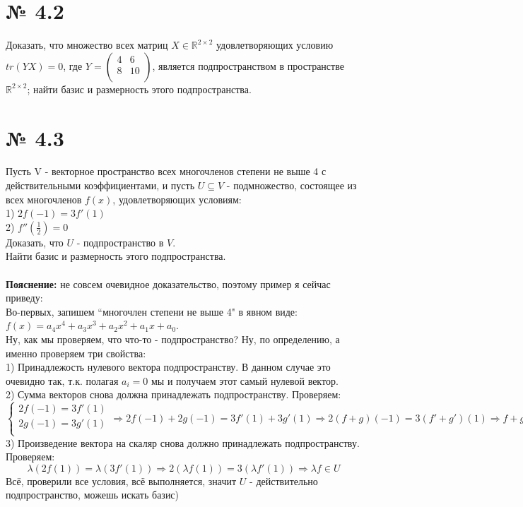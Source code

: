\documentclass[a4paper,11pt]{report}
\begin{document}
\section{№ 4.2}
Доказать, что множество всех матриц $X \in \mathbb{R}^{2\times2}$ удовлетворяющих условию $tr(YX) = 0$, где
$Y = 
\begin{pmatrix}
4 & 6\\
8 & 10\\
\end{pmatrix}
$, является подпространством в пространстве $\mathbb{R}^{2\times2}$; найти базис и размерность этого подпространства.\\
\section{№ 4.3} 
Пусть V - векторное пространство всех многочленов степени не выше 4 с действительными коэффициентами, и пусть
$U \subseteq V$ - подмножество, состоящее из всех многочленов $f(x)$, удовлетворяющих условиям:\\
1) $2f(-1) = 3f'(1)$\\
2) $f''(\frac{1}{2}) = 0$\\
Доказать, что $U$ - подпространство в $V$.\\
Найти базис и размерность этого подпространства.\\
\\
\textbf{Пояснение:} не совсем очевидное доказательство, поэтому пример я сейчас приведу:\\
Во-первых, запишем ``многочлен степени не выше 4" в явном виде: $f(x) = a_4x^4 + a_3x^3 + a_2x^2 + a_1x + a_0$.\\
Ну, как мы проверяем, что что-то - подпространство? Ну, по определению, а именно проверяем три свойства:\\
1) Принадлежость нулевого вектора подпространству. В данном случае это очевидно так, т.к. полагая $a_i = 0$ мы и получаем
этот самый нулевой вектор.\\
2) Сумма векторов снова должна принадлежать подпространству. Проверяем: \\
\[
\begin{cases}
 2f(-1) = 3f'(1)\\
 2g(-1) = 3g'(1)\\
\end{cases}
\Rightarrow
2f(-1) + 2g(-1) = 3f'(1) + 3g'(1)
\Rightarrow
2(f + g)(-1) = 3(f' + g')(1)
\Rightarrow 
f + g \in U
\]
3) Произведение вектора на скаляр снова должно принадлежать подпространству. Проверяем:\\
\[
\lambda(2f(1)) = \lambda(3f'(1)) 
\Rightarrow
2(\lambda{f}(1)) = 3(\lambda{f'}(1)) 
\Rightarrow 
\lambda{f} \in U
\]
Всё, проверили все условия, всё выполняется, значит $U$ - действительно подпространство, можешь искать базис)
\end{document}
